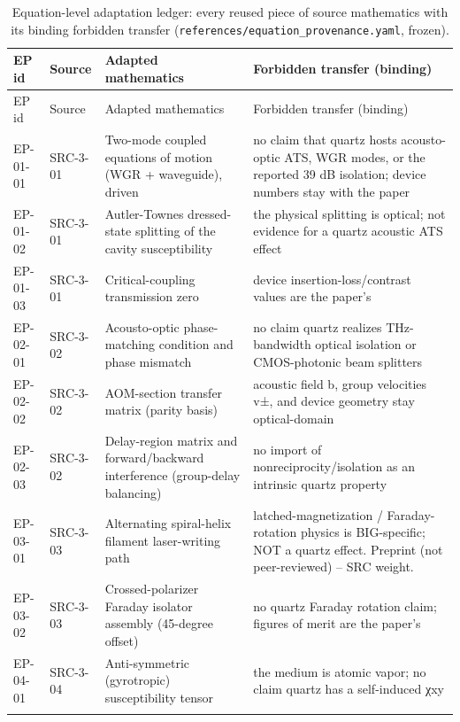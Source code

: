 \begin{landscape}
\begin{longtable}{@{}l l p{7.2cm} p{11.5cm}@{}}
\caption{Equation-level adaptation ledger: every reused piece of source mathematics with its binding forbidden transfer (\texttt{references/equation\_provenance.yaml}, frozen).}\label{tab:ledger}\\
\toprule EP id & Source & Adapted mathematics & Forbidden transfer (binding) \\ \midrule
\endfirsthead
\toprule EP id & Source & Adapted mathematics & Forbidden transfer (binding) \\ \midrule
\endhead
EP-01-01 & SRC-3-01 & Two-mode coupled equations of motion (WGR + waveguide), driven & no claim that quartz hosts acousto-optic ATS, WGR modes, or the reported 39 dB isolation; device numbers stay with the paper \\ \addlinespace
EP-01-02 & SRC-3-01 & Autler-Townes dressed-state splitting of the cavity susceptibility & the physical splitting is optical; not evidence for a quartz acoustic ATS effect \\ \addlinespace
EP-01-03 & SRC-3-01 & Critical-coupling transmission zero & device insertion-loss/contrast values are the paper's \\ \addlinespace
EP-02-01 & SRC-3-02 & Acousto-optic phase-matching condition and phase mismatch & no claim quartz realizes THz-bandwidth optical isolation or CMOS-photonic beam splitters \\ \addlinespace
EP-02-02 & SRC-3-02 & AOM-section transfer matrix (parity basis) & acoustic field b, group velocities v±, and device geometry stay optical-domain \\ \addlinespace
EP-02-03 & SRC-3-02 & Delay-region matrix and forward/backward interference (group-delay balancing) & no import of nonreciprocity/isolation as an intrinsic quartz property \\ \addlinespace
EP-03-01 & SRC-3-03 & Alternating spiral-helix filament laser-writing path & latched-magnetization / Faraday-rotation physics is BIG-specific; NOT a quartz effect. Preprint (not peer-reviewed) -- SRC weight. \\ \addlinespace
EP-03-02 & SRC-3-03 & Crossed-polarizer Faraday isolator assembly (45-degree offset) & no quartz Faraday rotation claim; figures of merit are the paper's \\ \addlinespace
EP-04-01 & SRC-3-04 & Anti-symmetric (gyrotropic) susceptibility tensor & the medium is atomic vapor; no claim quartz has a self-induced χxy \\ \addlinespace

\end{longtable}
\end{landscape}
